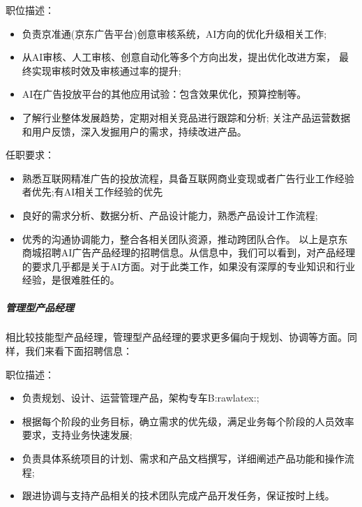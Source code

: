 \documentclass[letterpaper,10pt,english]{sphinxmanual}
\begin{document}
职位描述：
\begin{itemize}
\item {} 
负责京准通(京东广告平台)创意审核系统，AI方向的优化升级相关工作;

\item {} 
从AI审核、人工审核、创意自动化等多个方向出发，提出优化改进方案，
最终实现审核时效及审核通过率的提升;

\item {} 
AI在广告投放平台的其他应用试验：包含效果优化，预算控制等。

\item {} 
了解行业整体发展趋势，定期对相关竞品进行跟踪和分析;
关注产品运营数据和用户反馈，深入发掘用户的需求，持续改进产品。

\end{itemize}

任职要求：
\begin{itemize}
\item {} 
熟悉互联网精准广告的投放流程，具备互联网商业变现或者广告行业工作经验者优先;有AI相关工作经验的优先

\item {} 
良好的需求分析、数据分析、产品设计能力，熟悉产品设计工作流程;

\item {} 
优秀的沟通协调能力，整合各相关团队资源，推动跨团队合作。
以上是京东商城招聘AI广告产品经理的招聘信息。从信息中，我们可以看到，对产品经理的要求几乎都是关于AI方面。对于此类工作，如果没有深厚的专业知识和行业经验，是很难胜任的。

\end{itemize}


\subparagraph{管理型产品经理}
\label{\detokenize{chapter_introduction/PM:id40}}
相比较技能型产品经理，管理型产品经理的要求更多偏向于规划、协调等方面。同样，我们来看下面招聘信息：

职位描述：
\begin{itemize}
\item {} 
负责规划、设计、运营管理产品，架构专车B:raw\sphinxhyphen{}latex:;

\item {} 
根据每个阶段的业务目标，确立需求的优先级，满足业务每个阶段的人员效率要求，支持业务快速发展;

\item {} 
负责具体系统项目的计划、需求和产品文档撰写，详细阐述产品功能和操作流程;

\item {} 
跟进协调与支持产品相关的技术团队完成产品开发任务，保证按时上线。

\end{itemize}
\end{document}
